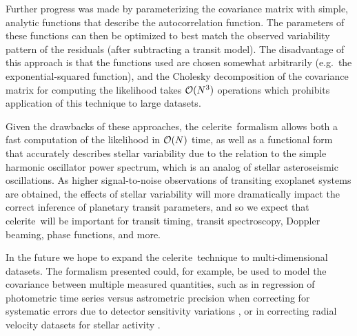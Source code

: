 \documentclass[manuscript, letterpaper]{aastex6}
\newcommand{\project}[1]{\textsf{#1}}
\newcommand{\celerite}{\project{celerite}}
\begin{document}
Further progress was made by parameterizing the covariance matrix with simple,
analytic functions that describe the autocorrelation function.  The parameters
of these functions can then be optimized to best match the observed variability
pattern of the residuals (after subtracting a transit model).  The disadvantage of
this approach is that the functions used are chosen somewhat arbitrarily (e.g.\
the exponential-squared function), and the Cholesky decomposition of the covariance
matrix for computing the likelihood takes ${\cal O}(N^3)$ operations which prohibits
application of this technique to large datasets.

Given the drawbacks of these approaches, the \celerite\ formalism allows both a fast
computation of the likelihood in ${\cal O}(N)$ time, as well as a functional form
that accurately describes stellar variability due to the relation to the simple
harmonic oscillator power spectrum, which is an analog of stellar asteroseismic
oscillations.  As higher signal-to-noise observations of transiting exoplanet systems
are obtained, the effects of stellar variability will more dramatically impact the
correct inference of planetary transit parameters, and so we expect that \celerite\
will be important for transit timing, transit spectroscopy, Doppler beaming,
phase functions, and more.

In the future we hope to expand the \celerite\ technique to multi-dimensional
datasets.  The formalism presented could, for example, be used to model
the covariance between multiple measured quantities, such as in regression of photometric
time series versus astrometric precision when correcting for systematic errors
due to detector sensitivity variations \citep{Aigrain2016}, or in correcting
radial velocity datasets for stellar activity \citep{Haywood2014,Rajpaul2017}.
\end{document}
